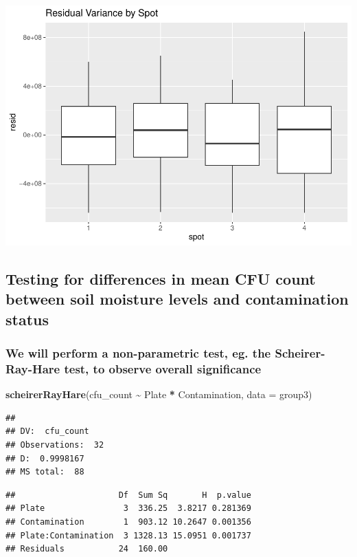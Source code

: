 \documentclass[
]{article}
\newenvironment{Shaded}{\begin{snugshade}}{\end{snugshade}}
\newcommand{\AttributeTok}[1]{\textcolor[rgb]{0.13,0.29,0.53}{#1}}
\newcommand{\FunctionTok}[1]{\textcolor[rgb]{0.13,0.29,0.53}{\textbf{#1}}}
\newcommand{\NormalTok}[1]{#1}
\newcommand{\SpecialCharTok}[1]{\textcolor[rgb]{0.81,0.36,0.00}{\textbf{#1}}}
\begin{document}
\includegraphics{analysis_files/figure-latex/plot-residuals-group3-1.pdf}

\subsection{Testing for differences in mean CFU count between soil
moisture levels and contamination
status}\label{testing-for-differences-in-mean-cfu-count-between-soil-moisture-levels-and-contamination-status-1}

\subsubsection{We will perform a non-parametric test, eg. the
Scheirer-Ray-Hare test, to observe overall
significance}\label{we-will-perform-a-non-parametric-test-eg.-the-scheirer-ray-hare-test-to-observe-overall-significance-1}

\begin{Shaded}
\begin{Highlighting}[]
\FunctionTok{scheirerRayHare}\NormalTok{(cfu\_count }\SpecialCharTok{\textasciitilde{}}\NormalTok{ Plate }\SpecialCharTok{*}\NormalTok{ Contamination, }\AttributeTok{data =}\NormalTok{ group3)}
\end{Highlighting}
\end{Shaded}

\begin{verbatim}
## 
## DV:  cfu_count 
## Observations:  32 
## D:  0.9998167 
## MS total:  88
\end{verbatim}

\begin{verbatim}
##                     Df  Sum Sq       H  p.value
## Plate                3  336.25  3.8217 0.281369
## Contamination        1  903.12 10.2647 0.001356
## Plate:Contamination  3 1328.13 15.0951 0.001737
## Residuals           24  160.00
\end{verbatim}
\end{document}
